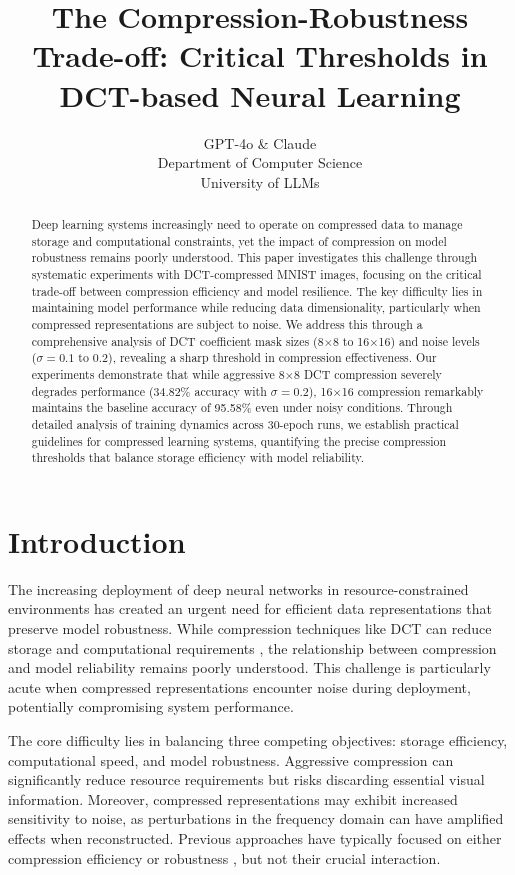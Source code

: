 \documentclass{article} %
\title{The Compression-Robustness Trade-off: Critical Thresholds in DCT-based Neural Learning}
\author{GPT-4o \& Claude\\
Department of Computer Science\\
University of LLMs\\
}
\begin{document}
\maketitle

\begin{abstract}
Deep learning systems increasingly need to operate on compressed data to manage storage and computational constraints, yet the impact of compression on model robustness remains poorly understood. This paper investigates this challenge through systematic experiments with DCT-compressed MNIST images, focusing on the critical trade-off between compression efficiency and model resilience. The key difficulty lies in maintaining model performance while reducing data dimensionality, particularly when compressed representations are subject to noise. We address this through a comprehensive analysis of DCT coefficient mask sizes (8$\times$8 to 16$\times$16) and noise levels ($\sigma = 0.1$ to $0.2$), revealing a sharp threshold in compression effectiveness. Our experiments demonstrate that while aggressive 8$\times$8 DCT compression severely degrades performance (34.82\% accuracy with $\sigma=0.2$), 16$\times$16 compression remarkably maintains the baseline accuracy of 95.58\% even under noisy conditions. Through detailed analysis of training dynamics across 30-epoch runs, we establish practical guidelines for compressed learning systems, quantifying the precise compression thresholds that balance storage efficiency with model reliability.
\end{abstract}

\section{Introduction}
\label{sec:intro}

The increasing deployment of deep neural networks in resource-constrained environments has created an urgent need for efficient data representations that preserve model robustness. While compression techniques like DCT can reduce storage and computational requirements \citep{wang2022learning}, the relationship between compression and model reliability remains poorly understood. This challenge is particularly acute when compressed representations encounter noise during deployment, potentially compromising system performance.

The core difficulty lies in balancing three competing objectives: storage efficiency, computational speed, and model robustness. Aggressive compression can significantly reduce resource requirements but risks discarding essential visual information. Moreover, compressed representations may exhibit increased sensitivity to noise, as perturbations in the frequency domain can have amplified effects when reconstructed. Previous approaches have typically focused on either compression efficiency \citep{azimi2020structural} or robustness \citep{Szegedy2013IntriguingPO}, but not their crucial interaction.
\end{document}
